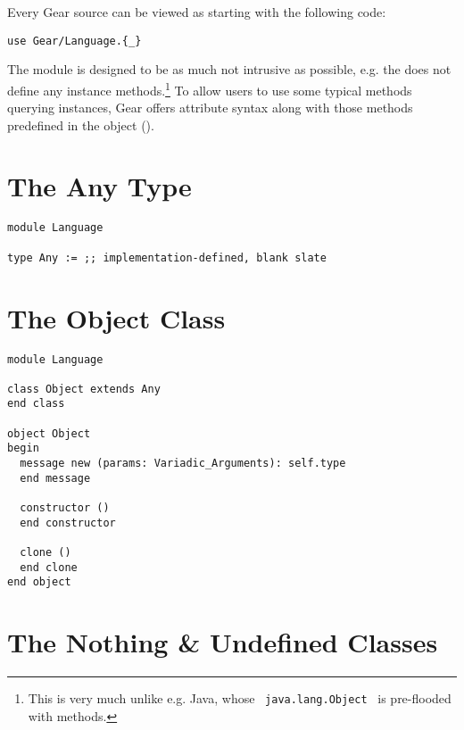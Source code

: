 Every Gear source can be viewed as starting with the following code:
\begin{lstlisting}
use Gear/Language.{_}
\end{lstlisting}

The  module is designed to be as much not intrusive as possible, e.g. the  does not define any instance methods.\footnote{This is very much unlike e.g. Java, whose ~\lstinline!java.lang.Object!~ is pre-flooded with methods.} To allow users to use some typical methods querying  instances, Gear offers attribute syntax along with those methods predefined in the  object (). 




\section{The Any Type}
\label{sec:lang-any}

\begin{lstlisting}
module Language

type Any := ;; implementation-defined, blank slate
\end{lstlisting}






\section{The Object Class}
\label{sec:lang-object}

\begin{lstlisting}
module Language

class Object extends Any 
end class

object Object
begin
  message new (params: Variadic_Arguments): self.type 
  end message
  
  constructor ()
  end constructor
  
  clone ()
  end clone
end object
\end{lstlisting}






\section{The Nothing \& Undefined Classes}
\label{sec:lang-nothing}
\label{sec:lang-undefined}

